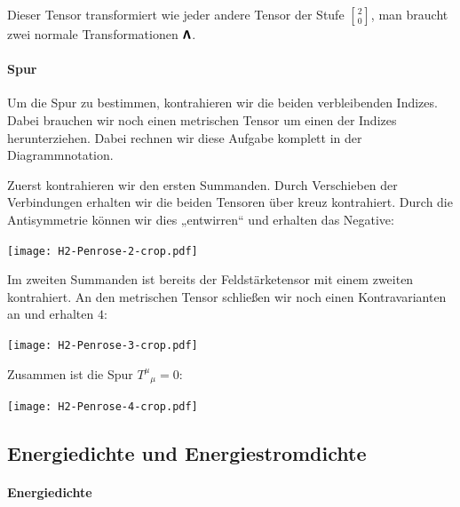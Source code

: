 Dieser Tensor transformiert wie jeder andere Tensor der Stufe ${2 \brack 0}$,
man braucht zwei normale Transformationen $\boldsymbol{\mathsf{\Lambda}}$.

\paragraph{Spur}

Um die Spur zu bestimmen, kontrahieren wir die beiden verbleibenden Indizes.
Dabei brauchen wir noch einen metrischen Tensor um einen der Indizes
herunterziehen. Dabei rechnen wir diese Aufgabe komplett in der
Diagrammnotation.

Zuerst kontrahieren wir den ersten Summanden. Durch Verschieben der
Verbindungen erhalten wir die beiden Tensoren über kreuz kontrahiert. Durch die
Antisymmetrie können wir dies „entwirren“ und erhalten das Negative:
\begin{center}
	\texttt{[image: H2-Penrose-2-crop.pdf]}
\end{center}

Im zweiten Summanden ist bereits der Feldstärketensor mit einem zweiten
kontrahiert. An den metrischen Tensor schließen wir noch einen Kontravarianten
an und erhalten $4$:
\begin{center}
	\texttt{[image: H2-Penrose-3-crop.pdf]}
\end{center}

Zusammen ist die Spur $T^\mu{}_\mu = 0$:
\begin{center}
	\texttt{[image: H2-Penrose-4-crop.pdf]}
\end{center}

\subsection{Energiedichte und Energiestromdichte}

\paragraph{Energiedichte}

